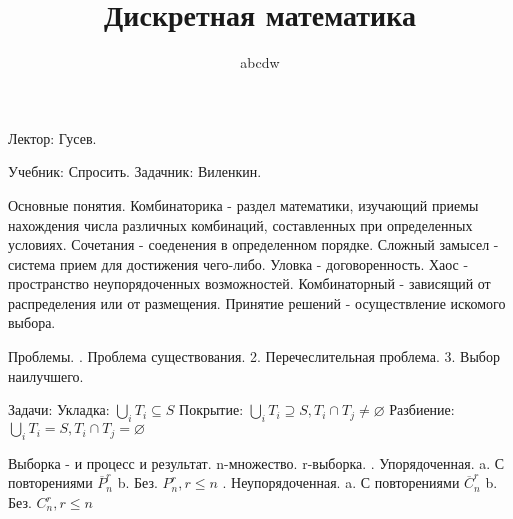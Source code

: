\documentclass[12pt]{article}
\title{Дискретная математика}
\date{}
\author{abcdw}
\begin{document}
    \maketitle
    Лектор: Гусев. \newline

    Учебник: Спросить. \newline
    Задачник: Виленкин. \newline

    Основные понятия. \newline
    Комбинаторика - раздел математики, изучающий приемы нахождения числа различных комбинаций, составленных при определенных условиях. \newline
    Сочетания - соеденения в определенном порядке. \newline
    Сложный замысел - система прием для достижения чего-либо. \newline
    Уловка - договоренность. \newline
    Хаос - пространство неупорядоченных возможностей. \newline
    Комбинаторный - зависящий от распределения или от размещения. \newline
    Принятие решений - осуществление искомого выбора. \newline

    Проблемы. . Проблема существования.
    2. Перечеслительная проблема.
    3. Выбор наилучшего.

    Задачи: \newline
    Укладка: $\bigcup\limits_i T_i \subseteq S$ \newline
    Покрытие: $\bigcup\limits_i T_i \supseteq S, T_i \cap T_j \not = \varnothing$ \newline
    Разбиение: $\bigcup\limits_i T_i = S, T_i \cap T_j = \varnothing$ \newline

    Выборка - и процесс и результат. \newline
    n-множество. \newline
    r-выборка. . Упорядоченная. \newline
        a. С повторениями $\overline P_n^r$ \newline
        b. Без. $P_n^r, r \leq n$ . Неупорядоченная. \newline
        a. С повторениями $\overline C_n^r$ \newline
        b. Без. $C_n^r, r \leq n$ \newline
\end{document}

